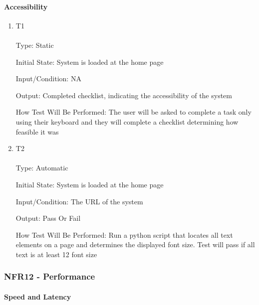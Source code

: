 \documentclass[12pt, titlepage]{article}
\begin{document}
\paragraph{Accessibility}
\begin{enumerate}
\item {T1\\}\\
Type: Static

Initial State: System is loaded at the home page

Input/Condition: NA

Output: Completed checklist, indicating the accessibility of the system

How Test Will Be Performed: The user will be asked to complete a task only using their keyboard and they will complete a checklist determining how feasible it was
\item {T2\\}\\
Type: Automatic

Initial State: System is loaded at the home page

Input/Condition: The URL of the system

Output: Pass Or Fail

How Test Will Be Performed: Run a python script that locates all text elements on a page and determines the displayed font size. Test will pass if all text is at least 12 font size
\end{enumerate}

\subsubsection{NFR12 - Performance}
		
\paragraph{Speed and Latency}
\end{document}
